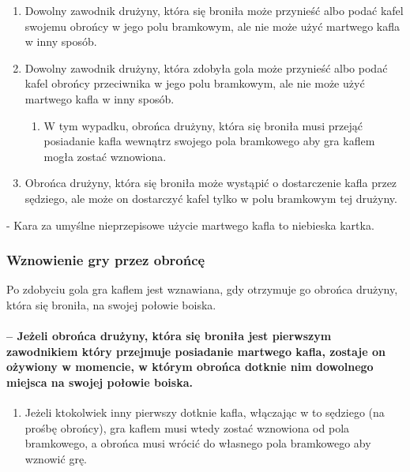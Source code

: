 \documentclass[12pt]{article}
\newcommand\bluecard{\bgroup\color{blue}\markoverwith{\textcolor{blue}{\rule[-0.5ex]{2pt}{0.4pt}}}\ULon}
\begin{document}
\begin{enumerate}
	\item
	      Dowolny zawodnik drużyny, która się broniła może przynieść albo podać
	      kafel swojemu obrońcy w jego polu bramkowym, ale nie może użyć
	      martwego kafla w inny sposób.
	\item
	      Dowolny zawodnik drużyny, która zdobyła gola może przynieść albo podać
	      kafel obrońcy przeciwnika w jego polu bramkowym, ale nie może użyć
	      martwego kafla w inny sposób.

	      \begin{enumerate}
		      \item
		            W tym wypadku, obrońca drużyny, która się broniła musi przejąć
		            posiadanie kafla wewnątrz swojego pola bramkowego aby gra kaflem
		            mogła zostać wznowiona.
	      \end{enumerate}
	\item
	      Obrońca drużyny, która się broniła może wystąpić o dostarczenie kafla
	      przez sędziego, ale może on dostarczyć kafel tylko w polu bramkowym
	      tej drużyny.
\end{enumerate}

\bluecard{Niebieska kartka} - Kara za umyślne nieprzepisowe użycie martwego
kafla to niebieska kartka.

\subsubsection{Wznowienie gry przez obrońcę}
Po zdobyciu gola gra
kaflem jest wznawiana, gdy otrzymuje go obrońca drużyny, która się
broniła, na swojej połowie boiska.

\paragraph{ -- Jeżeli obrońca drużyny, która się broniła jest
	pierwszym zawodnikiem który przejmuje posiadanie martwego kafla, zostaje
	on ożywiony w momencie, w którym obrońca dotknie nim dowolnego miejsca
	na swojej połowie boiska.}

\begin{enumerate}
	\item
	      Jeżeli ktokolwiek inny pierwszy dotknie kafla, włączając w to sędziego
	      (na prośbę obrońcy), gra kaflem musi wtedy zostać wznowiona od pola
	      bramkowego, a obrońca musi wrócić do własnego pola bramkowego aby
	      wznowić grę.
\end{enumerate}
\end{document}
